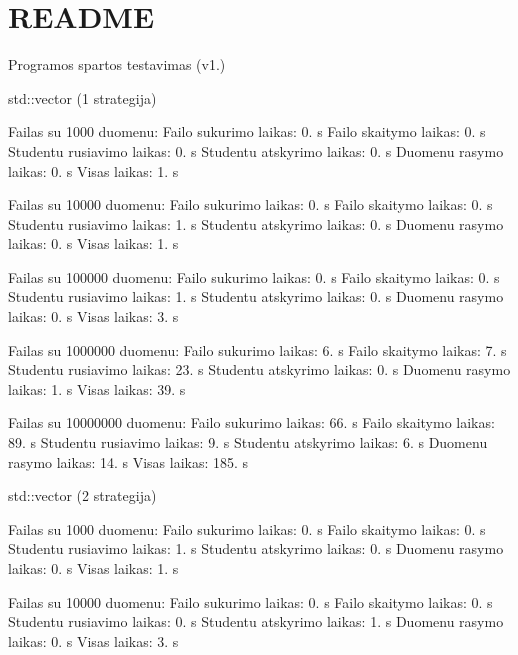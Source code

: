 \chapter{README}
\hypertarget{md__c_1_2_users_2vincas_2_documents_2_git_hub_2_o_o_p___l_a_b__2_2_r_e_a_d_m_e}{}\label{md__c_1_2_users_2vincas_2_documents_2_git_hub_2_o_o_p___l_a_b__2_2_r_e_a_d_m_e}
Programos spartos testavimas (v1.)

std\+::vector (1 strategija)

Failas su 1000 duomenu\+: Failo sukurimo laikas\+: 0. s Failo skaitymo laikas\+: 0. s Studentu rusiavimo laikas\+: 0. s Studentu atskyrimo laikas\+: 0. s Duomenu rasymo laikas\+: 0. s Visas laikas\+: 1. s

Failas su 10000 duomenu\+: Failo sukurimo laikas\+: 0. s Failo skaitymo laikas\+: 0. s Studentu rusiavimo laikas\+: 1. s Studentu atskyrimo laikas\+: 0. s Duomenu rasymo laikas\+: 0. s Visas laikas\+: 1. s

Failas su 100000 duomenu\+: Failo sukurimo laikas\+: 0. s Failo skaitymo laikas\+: 0. s Studentu rusiavimo laikas\+: 1. s Studentu atskyrimo laikas\+: 0. s Duomenu rasymo laikas\+: 0. s Visas laikas\+: 3. s

Failas su 1000000 duomenu\+: Failo sukurimo laikas\+: 6. s Failo skaitymo laikas\+: 7. s Studentu rusiavimo laikas\+: 23. s Studentu atskyrimo laikas\+: 0. s Duomenu rasymo laikas\+: 1. s Visas laikas\+: 39. s

Failas su 10000000 duomenu\+: Failo sukurimo laikas\+: 66. s Failo skaitymo laikas\+: 89. s Studentu rusiavimo laikas\+: 9. s Studentu atskyrimo laikas\+: 6. s Duomenu rasymo laikas\+: 14. s Visas laikas\+: 185. s

std\+::vector (2 strategija)

Failas su 1000 duomenu\+: Failo sukurimo laikas\+: 0. s Failo skaitymo laikas\+: 0. s Studentu rusiavimo laikas\+: 1. s Studentu atskyrimo laikas\+: 0. s Duomenu rasymo laikas\+: 0. s Visas laikas\+: 1. s

Failas su 10000 duomenu\+: Failo sukurimo laikas\+: 0. s Failo skaitymo laikas\+: 0. s Studentu rusiavimo laikas\+: 0. s Studentu atskyrimo laikas\+: 1. s Duomenu rasymo laikas\+: 0. s Visas laikas\+: 3. s

